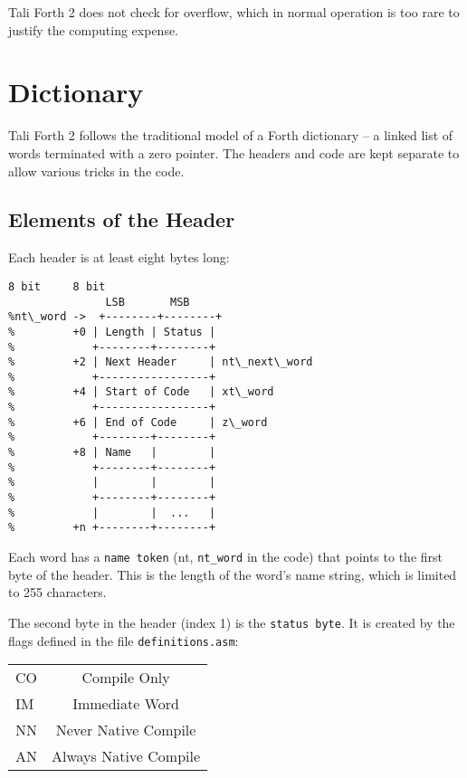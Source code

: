 Tali Forth 2 does not check for overflow, which in normal operation is too rare to
justify the computing expense. 

\section{Dictionary}


Tali Forth 2 follows the traditional model of a Forth dictionary -- a linked list
of words terminated with a zero pointer. The headers and code are kept separate
to allow various tricks in the code.


\subsection{Elements of the Header}

Each header is at least eight bytes long:

\begin{lstlisting}[frame=single]
              8 bit     8 bit
               LSB       MSB
%nt\_word ->  +--------+--------+
%         +0 | Length | Status |
%            +--------+--------+
%         +2 | Next Header     | nt\_next\_word
%            +-----------------+
%         +4 | Start of Code   | xt\_word 
%            +-----------------+
%         +6 | End of Code     | z\_word
%            +--------+--------+
%         +8 | Name   |        |
%            +--------+--------+
%            |        |        |
%            +--------+--------+
%            |        |  ...   |
%         +n +--------+--------+
\end{lstlisting}

Each word has a \texttt{name token} (nt, \texttt{nt\_word} in the code) that
points to the first byte of the header. This is the length of the word's name
string, which is limited to 255 characters. 

The second byte in the header (index 1) is the \texttt{status byte}. It is created by
the flags defined in the file \texttt{definitions.asm}: 

\begin{tabular}{ l c }
        CO & Compile Only\\
        IM & Immediate Word\\
        NN & Never Native Compile\\
        AN & Always Native Compile\\
\end{tabular}

